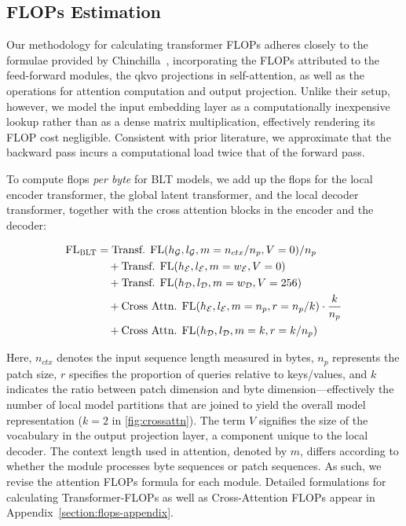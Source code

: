 \subsection{FLOPs Estimation} 
\label{section:flops}

Our methodology for calculating transformer FLOPs adheres closely to the formulae provided by Chinchilla~\citep{hoffmann2022training}, incorporating the FLOPs attributed to the feed-forward modules, the qkvo projections in self-attention, as well as the operations for attention computation and output projection. Unlike their setup, however, we model the input embedding layer as a computationally inexpensive lookup rather than as a dense matrix multiplication, effectively rendering its FLOP cost negligible. Consistent with prior literature, we approximate that the backward pass incurs a computational load twice that of the forward pass.

To compute flops \textit{per byte} for {\textsc BLT} models, we add up the flops for the local encoder transformer, the global latent transformer, and the local decoder transformer, together with the cross attention blocks in the encoder and the decoder:

\begin{align}
    \text{FL}_{\text{{\textsc BLT}}} &= \text{Transf. FL}(h_{\mathcal{G}}, l_{\mathcal{G}}, m=n_{ctx}/n_p, V=0) / n_p\\
   &\quad +\text{Transf. FL}(h_{\mathcal{E}}, l_{\mathcal{E}}, m=w_{\mathcal{E}}, V=0) \\
   &\quad + \text{Transf. FL}(h_{\mathcal{D}}, l_{\mathcal{D}}, m=w_{\mathcal{D}}, V=256) \\ 
    &\quad + \text{Cross Attn. FL}(h_{\mathcal{E}}, l_{\mathcal{E}}, m=n_p, r=n_p/k) \cdot \frac{k}{n_p} \\ 
   &\quad + \text{Cross Attn. FL}(h_{\mathcal{D}}, l_{\mathcal{D}}, m=k, r=k/n_p) 
\end{align}

Here, $n_{ctx}$ denotes the input sequence length measured in bytes, $n_p$ represents the patch size, $r$ specifies the proportion of queries relative to keys/values, and $k$ indicates the ratio between patch dimension and byte dimension—effectively the number of local model partitions that are joined to yield the overall model representation ($k=2$ in \autoref{fig:crossattn}). The term $V$ signifies the size of the vocabulary in the output projection layer, a component unique to the local decoder. The context length used in attention, denoted by $m$, differs according to whether the module processes byte sequences or patch sequences. As such, we revise the attention FLOPs formula for each module. Detailed formulations for calculating Transformer-FLOPs as well as Cross-Attention FLOPs appear in Appendix~\ref{section:flops-appendix}.

